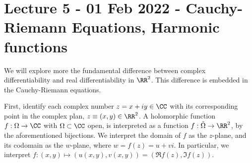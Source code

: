 \section{Lecture 5 - 01 Feb 2022 - Cauchy-Riemann Equations, Harmonic functions}
We will explore more the fundamental difference between complex
differentiability and real differentiability in $\RR^2$. This difference is
embedded in the Cauchy-Riemann equations.

First, identify each complex number $z=x+iy\in\CC$  with its corresponding point
in the complex plan, $z\equiv(x,y)\in\RR^2$. A holomorphic function
$f:\Omega\to\CC$ with $\Omega\subset\CC$ open, is interpreted as a function
$f:\tilde{\Omega}\to\RR^2$, by the aforementioned bijections. We interpret the
domain of $f$ as the $z$-plane, and its codomain as the $w$-plane, where
$w=f(z)=u+vi$. In particular, we interpret $f:(x,y)\mapsto (u(x,y),v(x,y))=(\Re
f(z), \Im f(z))$. 


